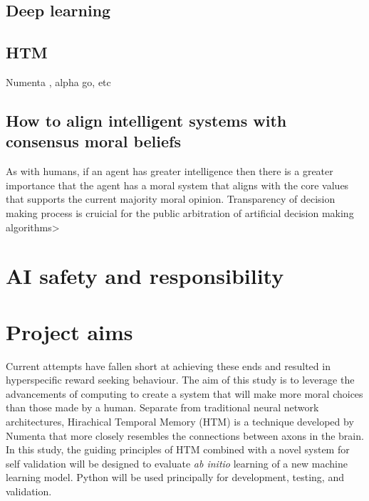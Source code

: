 \subsection{Deep learning}

\subsection{HTM}
Numenta \cite{numentahome}, alpha go, etc

\subsection{How to align intelligent systems with consensus moral beliefs}
As with humans, if an agent has greater intelligence then there is a greater importance that the agent has a moral system that aligns with the core values that supports the current majority moral opinion.
Transparency of decision making process is cruicial for the public arbitration of artificial decision making algorithms>

\section{AI safety and responsibility}

\section{Project aims}
Current attempts have fallen short at achieving these ends and resulted in hyperspecific reward seeking behaviour.
The aim of this study is to leverage the advancements of computing to create a system that will make more moral choices than those made by a human.
Separate from traditional neural network architectures, Hirachical Temporal Memory (HTM) is a technique developed by Numenta that more closely resembles the connections between axons in the brain.
In this study, the guiding principles of HTM combined with a novel system for self validation will be designed to evaluate \emph{ab initio} learning of a new machine learning model.
Python will be used principally for development, testing, and validation.
